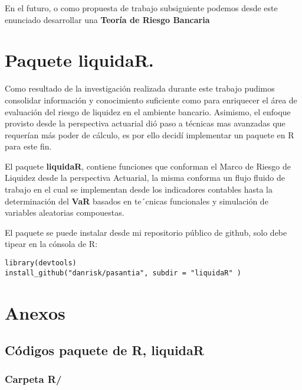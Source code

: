 \documentclass[]{article}
\begin{document}
En el futuro, o como propuesta de trabajo subsiguiente podemos desde
este enunciado desarrollar una \textbf{Teoría de Riesgo Bancaria}

\hypertarget{paquete-liquidar.}{%
\section{\texorpdfstring{Paquete
\textbf{liquidaR}.}{Paquete liquidaR.}}\label{paquete-liquidar.}}

Como resultado de la investigación realizada durante este trabajo
pudimos consolidar información y conocimiento suficiente como para
enriquecer el área de evaluación del riesgo de liquidez en el ambiente
bancario. Asimismo, el enfoque provisto desde la perspectiva actuarial
dió paso a técnicas mas avanzadas que requerían más poder de cálculo, es
por ello decidí implementar un paquete en R para este fin.

El paquete \textbf{liquidaR}, contiene funciones que conforman el Marco
de Riesgo de Liquidez desde la perspectiva Actuarial, la misma conforma
un flujo fluido de trabajo en el cual se implementan desde los
indicadores contables hasta la determinación del \textbf{VaR} basados en
te´cnicas funcionales y simulación de variables aleatorias compouestas.

El paquete se puede instalar desde mi repositorio público de github,
solo debe tipear en la cónsola de R:

\begin{verbatim}
library(devtools)
install_github("danrisk/pasantia", subdir = "liquidaR" )
\end{verbatim}

\hypertarget{anexos}{%
\section{Anexos}\label{anexos}}

\hypertarget{codigos-paquete-de-r-liquidar}{%
\subsection{\texorpdfstring{Códigos paquete de R,
\textbf{liquidaR}}{Códigos paquete de R, liquidaR}}\label{codigos-paquete-de-r-liquidar}}

\hypertarget{carpeta-r}{%
\subsubsection{\texorpdfstring{Carpeta
\textbf{R/}}{Carpeta R/}}\label{carpeta-r}}
\end{document}

